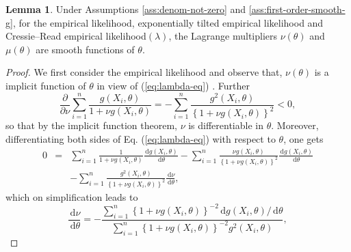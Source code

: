 \documentclass[oneside,english]{amsbook}
\numberwithin{section}{chapter}
\numberwithin{equation}{section}
\numberwithin{figure}{section}
\theoremstyle{plain}
\theoremstyle{plain}
\theoremstyle{definition}
\theoremstyle{plain}
\theoremstyle{plain}
\theoremstyle{remark}
\theoremstyle{definition}
\newtheorem{lemma}{Lemma}
\theoremstyle{definition}
\newcommand{\diff}{\,\mathrm{d}}
\begin{document}
\begin{lemma}
\label{lem:first-order-smooth-lagmul} Under Assumptions \ref{ass:denom-not-zero} and \ref{ass:first-order-smooth-g}, for the empirical likelihood, exponentially
tilted empirical likelihood and Cressie--Read empirical likelihood$\left(\lambda\right)$,
the Lagrange multipliers $\nu\left(\theta\right)$ and $\mu\left(\theta\right)$
are smooth functions of $\theta.$\end{lemma}
\begin{proof}
We first consider the empirical likelihood and observe that, $\nu\left(\theta\right)$
is a implicit function of $\theta$ in view of (\ref{eq:lambda-eq})
. Further 
\[
\frac{\partial}{\partial\nu}\sum_{i=1}^{n}\frac{g\left(X_{i},\theta\right)}{1+\nu g\left(X_{i},\theta\right)}=-\sum_{i=1}^{n}\frac{g^{2}\left(X_{i},\theta\right)}{\left\{ 1+\nu g\left(X_{i},\theta\right)\right\} ^{2}}<0,
\]
so that by the implicit function theorem, $\nu$ is differentiable
in $\theta$. Moreover, differentiating both sides of Eq. (\ref{eq:lambda-eq})
with respect to $\theta$, one gets
\begin{eqnarray*}
0 & = & \sum_{i=1}^{n}\frac{1}{1+\nu g\left(X_{i},\theta\right)}\frac{\diff g\left(X_{i},\theta\right)}{\diff\theta}-\sum_{i=1}^{n}\frac{\nu g\left(X_{i},\theta\right)}{\left\{ 1+\nu g\left(X_{i},\theta\right)\right\} ^{2}}\frac{\diff g\left(X_{i},\theta\right)}{\diff\theta}\\
 &  & -\sum_{i=1}^{n}\frac{g^{2}\left(X_{i},\theta\right)}{\left\{ 1+\nu g\left(X_{i},\theta\right)\right\} ^{2}}\frac{\diff\nu}{\diff\theta},
\end{eqnarray*}
which on simplification leads to 
\begin{equation}
\frac{\diff\nu}{\diff\theta}=-\frac{\sum_{i=1}^{n}\left\{ 1+\nu g\left(X_{i},\theta\right)\right\} ^{-2}\diff g\left(X_{i},\theta\right)/\diff\theta}{\sum_{i=1}^{n}\left\{ 1+\nu g\left(X_{i},\theta\right)\right\} ^{-2}g^{2}\left(X_{i},\theta\right)},\label{eq:decreasing-theta-to-nu}
\end{equation}



\end{proof}
\end{document}
